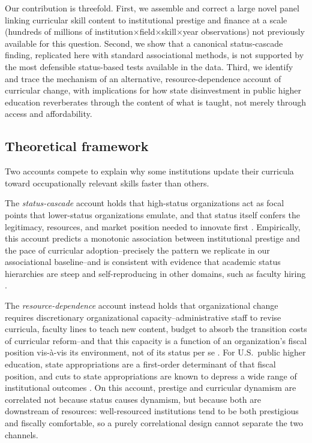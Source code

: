 \documentclass[11pt, letterpaper]{article}
\newcommand{\parencite}[1]{\cite{#1}}
\begin{document}
Our contribution is threefold. First, we assemble and correct a large novel panel linking curricular skill content to institutional prestige and finance at a scale (hundreds of millions of institution$\times$field$\times$skill$\times$year observations) not previously available for this question. Second, we show that a canonical status-cascade finding, replicated here with standard associational methods, is not supported by the most defensible status-based tests available in the data. Third, we identify and trace the mechanism of an alternative, resource-dependence account \parencite{pfeffersalancik1978} of curricular change, with implications for how state disinvestment in public higher education reverberates through the content of what is taught, not merely through access and affordability.

\subsection*{Theoretical framework}

Two accounts compete to explain why some institutions update their curricula toward occupationally relevant skills faster than others.

The \emph{status-cascade} account holds that high-status organizations act as focal points that lower-status organizations emulate, and that status itself confers the legitimacy, resources, and market position needed to innovate first \parencite{podolny1993, phillipszuckerman2001, strangsoule1998}. Empirically, this account predicts a monotonic association between institutional prestige and the pace of curricular adoption--precisely the pattern we replicate in our associational baseline--and is consistent with evidence that academic status hierarchies are steep and self-reproducing in other domains, such as faculty hiring \parencite{clauset2015}.

The \emph{resource-dependence} account instead holds that organizational change requires discretionary organizational capacity--administrative staff to revise curricula, faculty lines to teach new content, budget to absorb the transition costs of curricular reform--and that this capacity is a function of an organization's fiscal position vis-\`a-vis its environment, not of its status per se \parencite{pfeffersalancik1978}. For U.S.\ public higher education, state appropriations are a first-order determinant of that fiscal position, and cuts to state appropriations are known to depress a wide range of institutional outcomes \parencite{demingwalters2017}. On this account, prestige and curricular dynamism are correlated not because status causes dynamism, but because both are downstream of resources: well-resourced institutions tend to be both prestigious and fiscally comfortable, so a purely correlational design cannot separate the two channels.
\end{document}
